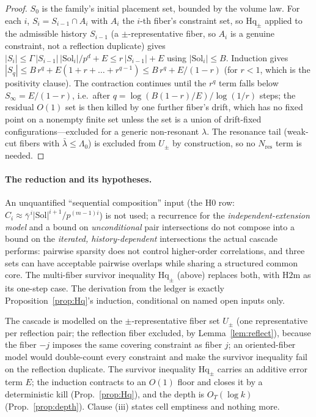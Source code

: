 \begin{proof}
$S_0$ is the family's initial placement set, bounded by the volume law.
For each $i$, $S_i=S_{i-1}\cap A_i$ with $A_i$ the $i$-th fiber's
constraint set, so $\mathrm{Hq}_\pm$ applied to the admissible history
$S_{i-1}$ (a $\pm$-representative fiber, so $A_i$ is a genuine constraint,
not a reflection duplicate) gives
$|S_i|\le\Gamma\,|S_{i-1}|\,|\mathrm{Sol}_i|/p^{d}+E\le r\,|S_{i-1}|+E$
using $|\mathrm{Sol}_i|\le B$. Induction gives
$|S_q|\le B\,r^{q}+E(1+r+\dots+r^{q-1})\le B\,r^{q}+E/(1-r)$ (for $r<1$,
which is the positivity clause). The contraction continues until the
$r^{q}$ term falls below $S_\infty=E/(1-r)$, i.e.\ after
$q=\log(B(1-r)/E)/\log(1/r)$ steps; the residual $O(1)$ set is then killed
by one further fiber's drift, which has no fixed point on a nonempty finite
set unless the set is a union of drift-fixed configurations---excluded for a
generic non-resonant $\lambda$. The resonance tail (weak-cut fibers with
$\bar\lambda\le\Lambda_0$) is excluded from $U_\pm$ by construction, so no
$N_{\mathrm{res}}$ term is needed.
\end{proof}

\paragraph{The reduction and its hypotheses.}
An unquantified ``sequential composition'' input
(the $\mathrm{H0}$ row: $C_i\approx
\bar\gamma^{\,i}|\mathrm{Sol}|^{i+1}/p^{(m-1)i}$) is not used; a recurrence for the
\emph{independent-extension model} and a bound on \emph{unconditional} pair
intersections do not compose into a bound on the \emph{iterated,
history-dependent} intersections the actual cascade performs: pairwise
sparsity does not control higher-order correlations, and three sets can have
acceptable pairwise overlaps while sharing a structured common core. The
multi-fiber survivor inequality $\mathrm{Hq}_\pm$ (above) replaces both, with
$\mathrm{H2m}$ as its one-step case. The derivation from the ledger is
exactly Proposition~\ref{prop:Hq}'s induction, conditional on named open
inputs only.

The cascade is modelled on the $\pm$-representative fiber set $U_\pm$
(one representative per reflection pair; the reflection fiber excluded, by
Lemma~\ref{lem:reflect}), because the fiber $-j$ imposes the same covering
constraint as fiber $j$; an oriented-fiber model would double-count every
constraint and make the survivor inequality fail on the reflection duplicate.
The survivor inequality $\mathrm{Hq}_\pm$ carries an additive error term $E$;
the induction contracts to an $O(1)$ floor and closes it by a deterministic
kill (Prop.~\ref{prop:Hq}), and the depth is $O_T(\log k)$
(Prop.~\ref{prop:depth}). Clause (iii) states cell emptiness and nothing more.


